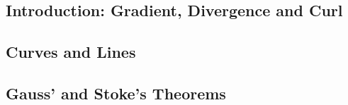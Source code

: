 \subsection{Introduction: Gradient, Divergence and Curl}
\subsection{Curves and Lines}
\subsection{Gauss' and Stoke's Theorems}  